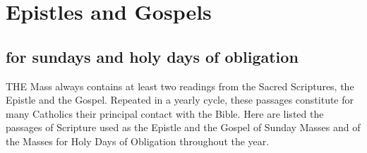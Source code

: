 \newcommand{\linemup}[3]{\parbox[b]{0.43\textwidth}{\raggedright #1\strut}\hfill\parbox[b]{0.3\textwidth}{\raggedright #2\strut}\hfill\parbox[b]{0.22\textwidth}{\raggedright #3\strut}}


\section{Epistles and Gospels}

\subsection{for sundays and holy days of obligation}

THE Mass always contains at least two readings from the Sacred Scriptures, the
Epistle and the Gospel. Repeated in a yearly cycle, these passages constitute for many Catholics their
principal contact with the Bible. Here are listed the passages of Scripture used as the Epistle and the
Gospel of Sunday Masses and of the Masses for Holy Days of Obligation throughout the year.

\footnotesize

